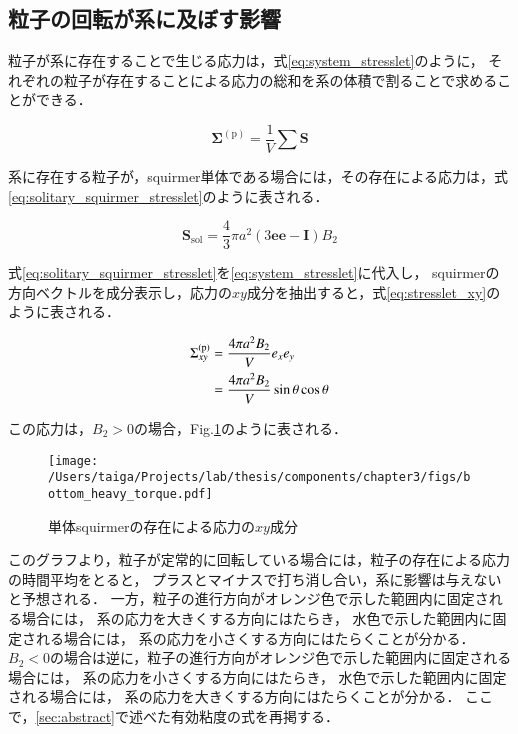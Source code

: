 \subsection{粒子の回転が系に及ぼす影響}
粒子が系に存在することで生じる応力は，式\eqref{eq:system_stresslet}のように，
それぞれの粒子が存在することによる応力の総和を系の体積で割ることで求めることができる\cite{dilute_squirmer}．

    \begin{equation}
        \boldsymbol{\Sigma}^\mathrm{(p)} = \frac{1}{V} \sum \boldsymbol{S}
        \label{eq:system_stresslet}
    \end{equation}

\noindent
系に存在する粒子が，squirmer単体である場合には，その存在による応力は，式\eqref{eq:solitary_squirmer_stresslet}のように表される\cite{dilute_squirmer}．

    \begin{equation}
        \boldsymbol{S}_\mathrm{sol} = \frac{4}{3} \pi a^2 (3 \boldsymbol{ee} - \boldsymbol{I}) B_2
        \label{eq:solitary_squirmer_stresslet}
    \end{equation}

\noindent
式\eqref{eq:solitary_squirmer_stresslet}を\eqref{eq:system_stresslet}に代入し，
squirmerの方向ベクトルを成分表示し，応力の$xy$成分を抽出すると，式\eqref{eq:stresslet_xy}のように表される．

    \begin{align}
        \Sigma^\mathrm{(p)}_{xy} &= \frac{4 \pi a^2 B_2}{V} e_x e_y \notag \\
            &= \frac{4 \pi a^2 B_2}{V} \sin \theta \cos \theta
        \label{eq:stresslet_xy}
    \end{align}

\noindent
この応力は，$B_2 > 0$の場合，Fig.\ref{fig:stresslet_xy}のように表される．

    \begin{figure}[H]
        \centering
        \texttt{[image: /Users/taiga/Projects/lab/thesis/components/chapter3/figs/bottom\_heavy\_torque.pdf]}
        \caption{単体squirmerの存在による応力の$xy$成分}
        \label{fig:stresslet_xy}
    \end{figure}

\noindent
このグラフより，粒子が定常的に回転している場合には，粒子の存在による応力の時間平均をとると，
プラスとマイナスで打ち消し合い，系に影響は与えないと予想される．
一方，粒子の進行方向がオレンジ色で示した範囲内に固定される場合には，
系の応力を大きくする方向にはたらき，
水色で示した範囲内に固定される場合には，
系の応力を小さくする方向にはたらくことが分かる．
$B_2<0$の場合は逆に，粒子の進行方向がオレンジ色で示した範囲内に固定される場合には，
系の応力を小さくする方向にはたらき，
水色で示した範囲内に固定される場合には，
系の応力を大きくする方向にはたらくことが分かる．
ここで，\ref{sec:abstract}で述べた有効粘度の式を再掲する．

